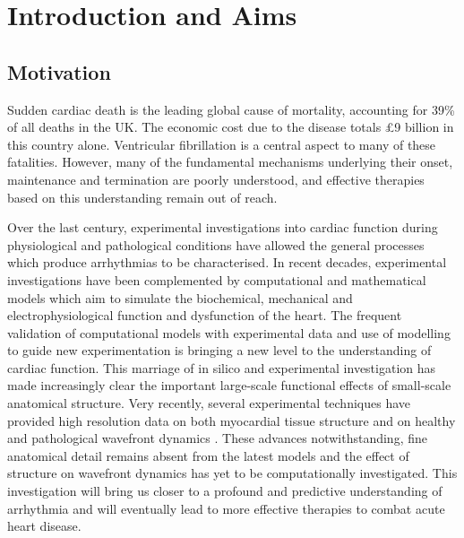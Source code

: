 \chapter{Introduction and Aims}
\dblspace

\section{Motivation}
\label{sec:intro:motivation}
  Sudden cardiac death is the leading global cause of mortality, accounting for 39\% of all deaths in the UK. The economic cost due to the disease totals \pounds9 billion in this country alone. Ventricular fibrillation is a central aspect to many of these fatalities. However, many of the fundamental mechanisms underlying their onset, maintenance and termination are poorly understood, and effective therapies based on this understanding remain out of reach.
  
  Over the last century, experimental investigations into cardiac function during physiological and pathological conditions have allowed the general processes which produce arrhythmias to be characterised. In recent decades, experimental investigations have been complemented by computational and mathematical models which aim to simulate the biochemical, mechanical and electrophysiological function and dysfunction of the heart. The frequent validation of computational models with experimental data and use of modelling to guide new experimentation is bringing a new level to the understanding of cardiac function. This marriage of in silico and experimental investigation has made increasingly clear the important large-scale functional effects of small-scale anatomical structure. Very recently, several experimental techniques have provided high resolution data on both myocardial tissue structure and on healthy and pathological wavefront dynamics \cite{Burton2006,Plank2009,Bishop2009}. These advances notwithstanding, fine anatomical detail remains absent from the latest models and the effect of structure on wavefront dynamics has yet to be computationally investigated. This investigation will bring us closer to a profound and predictive understanding of arrhythmia and will eventually lead to more effective therapies to combat acute heart disease.

